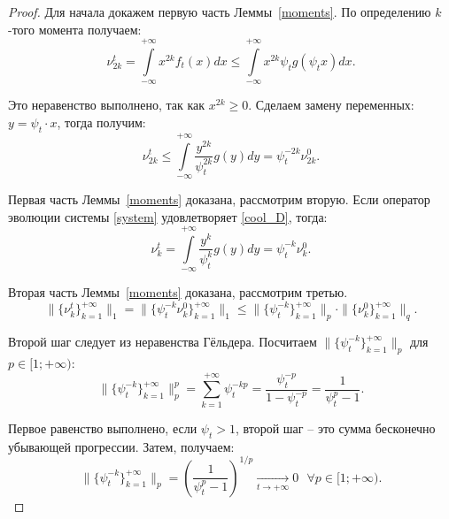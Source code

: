         \begin{proof}
            Для начала докажем первую часть Леммы~\ref{moments}. По определению $k$-того момента получаем:
            \begin{equation*}
                \nu_{2k}^t = \int\limits_{-\infty}^{+\infty} x^{2k} f_t(x) dx \leq \int\limits_{-\infty}^{+\infty} x^{2k} \psi_t g(\psi_t x) dx.
            \end{equation*}
            
           Это неравенство выполнено, так как $x^{2k} \geq 0$. Сделаем замену переменных: $y = \psi_t \cdot x$, тогда получим:
            \begin{equation*}
                \nu_{2k}^t \leq \int\limits_{-\infty}^{+\infty} \dfrac{y^{2k}}{\psi_t^{2k}} g(y) dy = \psi_t^{-2k} \nu_{2k}^0.
            \end{equation*}
            
            Первая часть Леммы~\ref{moments} доказана, рассмотрим вторую. Если оператор эволюции системы \eqref{system} удовлетворяет \eqref{cool_D}, тогда:
            \begin{equation*}
                \nu_{k}^t = \int\limits_{-\infty}^{+\infty} \dfrac{y^k}{\psi_t^k} g(y) dy = \psi_t^{-k} \nu_{k}^0.
            \end{equation*}
            
            Вторая часть Леммы~\ref{moments} доказана, рассмотрим третью.
            \begin{equation*}
                \|\{\nu_k^t\}_{k=1}^{+\infty}\|_1 = \|\{\psi_t^{-k} \nu_k^0\}_{k=1}^{+\infty}\|_1 \leq \|\{\psi_t^{-k}\}_{k=1}^{+\infty}\|_p \cdot \|\{\nu_k^0\}_{k=1}^{+\infty}\|_q.
            \end{equation*}
            
            Второй шаг следует из неравенства Гёльдера.
            Посчитаем $\|\{\psi_t^{-k}\}_{k=1}^{+\infty}\|_p$ для $p \in [1; +\infty)$:
            \begin{equation*}
                \|\{\psi_t^{-k}\}_{k=1}^{+\infty}\|_p^p = \sum\limits_{k=1}^{+\infty}\psi_t^{-kp} = \dfrac{\psi_t^{-p}}{1 - \psi_t^{-p}} = \dfrac{1}{\psi_t^p - 1}.
            \end{equation*}
            
            Первое равенство выполнено, если $\psi_t > 1$, второй шаг -- это сумма бесконечно убывающей прогрессии. Затем, получаем:
            \begin{equation*}
                \|\{\psi_t^{-k}\}_{k=1}^{+\infty}\|_p = \left( \dfrac{1}{\psi_t^p - 1} \right)^{1/p} \underset{t \to +\infty}{\longrightarrow} 0 ~~~\forall p \in [1; +\infty).
            \end{equation*}
            

\end{proof}
